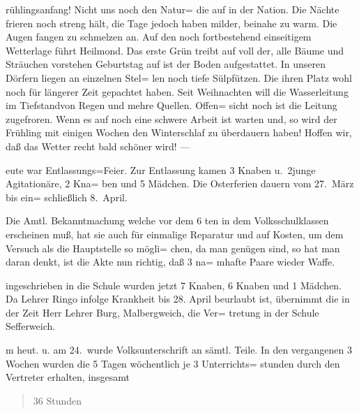 

%
rühlingsanfang! Nicht uns noch den Natur=\ob
die auf in der Nation. Die Nächte frieren noch\ob
streng hält, die Tage jedoch haben milder, beinahe\ob
zu warm. Die Augen fangen zu schmelzen\ob
an. Auf den noch fortbestehend einseitigem Wetterlage\ob
führt Heilmond\unsicher. Das erste Grün treibt auf\ob
voll der, alle Bäume und Sträuchen vorstehen\ob
Geburtstag auf ist der Boden aufgestattet. In\ob
unseren Dörfern liegen an einzelnen Stel=\ob
len noch tiefe Sülpfützen. Die ihren Platz wohl\ob
noch für längerer Zeit gepachtet haben. Seit\ob
Weihnachten will die Wasserleitung im\ob
Tiefstand\unsicher von Regen und mehre Quellen. Offen=\ob
sicht noch ist die Leitung zugefroren. Wenn\ob
es auf noch eine schwere Arbeit ist warten und\unsicher,\ob
so wird der Frühling mit einigen Wochen\ob
den Winterschlaf zu überdauern haben! Hoffen wir, daß\ob
das Wetter recht bald schöner wird! —

%
eute war Entlassungs=Feier. Zur Entlassung\ob
kamen 3 Knaben u.\ 2\unsicher junge Agitationäre, 2 Kna=\ob
ben und 5 Mädchen.\ob
Die Osterferien dauern vom 27.\ März bis ein=\ob
schließlich 8.\ April.

Die Amtl. Bekanntmachung welche vor dem 6 ten\ob
in dem Volksschulklassen erscheinen muß, hat sie\ob
auch für einmalige Reparatur und auf Kosten,\ob
um dem Versuch als die Hauptstelle so mögli=\ob
chen, da man genügen sind, so hat man daran\ob
denkt, ist die Akte nun richtig, daß 3 na=\ob
mhafte Paare wieder Waffe.

%
ingeschrieben in die Schule wurden\ob
jetzt 7 Knaben, 6 Knaben und 1 Mädchen.\ob
Da Lehrer Ringo infolge Krankheit bis 28.\ob
April beurlaubt ist, übernimmt die in der\ob
Zeit Herr Lehrer Burg, Malbergweich, die Ver=\ob
tretung in der Schule Sefferweich.

%
m heut. u. am 24.\ wurde Volksunterschrift an\ob
sämtl. Teile. In den vergangenen 3 Wochen\ob
wurden die 5 Tagen wöchentlich je 3 Unterrichts=\ob
stunden durch den Vertreter erhalten, insgesamt

\pend
\begin{verse}
36 Stunden
\end{verse}
\pstart
\pend
